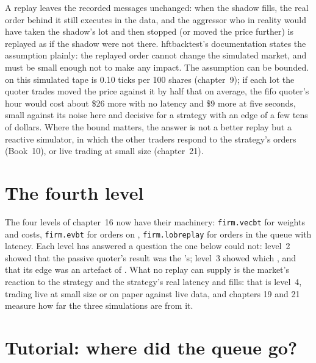A replay leaves the recorded messages unchanged: when the shadow fills, the real order behind it still executes in the data, and the aggressor who in
reality would have taken the shadow's lot and then stopped (or moved the price further) is replayed as if the shadow were not there. hftbacktest's
documentation states the assumption plainly: the replayed order cannot change the simulated market, and must be small enough not to make any impact.
The assumption can be bounded.  on this simulated tape is 0.10 ticks per 100 shares (chapter~9); if each lot the quoter trades moved the
price against it by half that on average, the fifo quoter's hour would cost about \$26 more with no latency and \$9 more at five seconds, small against
its noise here and decisive for a strategy with an edge of a few tens of dollars. Where the bound matters, the answer is not a better replay but a
reactive simulator, in which the other traders respond to the strategy's orders (Book~10), or live trading at small size (chapter~21).

\section{The fourth level}

The four levels of chapter~16 now have their machinery: \texttt{firm.vecbt} for weights and costs, \texttt{firm.evbt} for orders on ,
\texttt{firm.lobreplay} for orders in the queue with latency. Each level has answered a question the one below could not: level~2 showed that the passive
quoter's result was the 's; level~3 showed which , and that its edge was an artefact of . What no replay can supply is
the market's reaction to the strategy and the strategy's real latency and fills: that is level~4, trading live at small size or on paper against live
data, and chapters 19 and 21 measure how far the three simulations are from it.

\section{Tutorial: where did the queue go?}\label{tut:rs:order-book-replay-simulation:tut}

